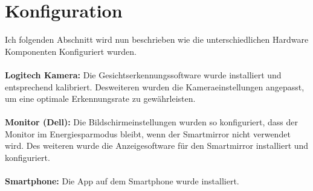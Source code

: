 \section{Konfiguration}
Ich folgenden Abschnitt wird nun beschrieben wie die unterschiedlichen Hardware Komponenten Konfiguriert wurden. \\ \\
\noindent
\textbf{Logitech Kamera:}
Die Gesichtserkennungssoftware wurde installiert und entsprechend kalibriert. Desweiteren wurden die Kameraeinstellungen angepasst, um eine optimale Erkennungsrate zu gewährleisten. \\ \\
\noindent
\textbf{Monitor (Dell):}
Die Bildschirmeinstellungen wurden so konfiguriert, dass der Monitor im Energiesparmodus bleibt, wenn der Smartmirror nicht verwendet wird. Des weiteren wurde die Anzeigesoftware für den Smartmirror installiert und konfiguriert. \\ \\
\noindent
\textbf{Smartphone:}
Die App auf dem Smartphone wurde installiert.

